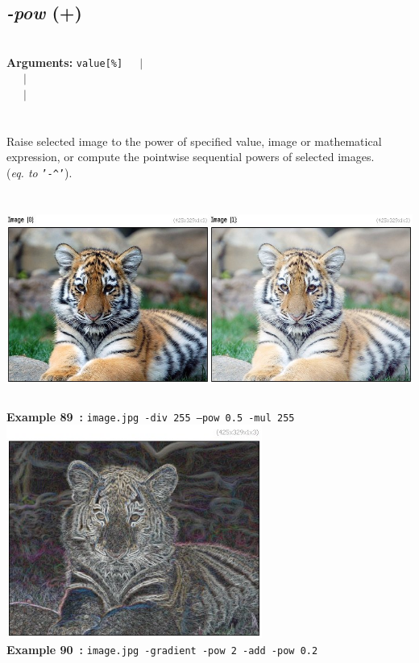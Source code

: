 \documentclass[a4paper,11pt,twoside]{book}
\begin{document}
\subsection{\emph{-pow} (+)}\vspace*{-0.5em}
~\\\textbf{Arguments: } 
{\small \texttt{value[\%]}}~~~$|$\\
\hspace*{2.2cm}{\small \texttt{[image]}}~~~$|$\\
~~~$|$\\
\\~\\
Raise selected image to the power of specified value, image or mathematical
expression, or compute the pointwise sequential powers of selected images.
~\\(\emph{eq. to} {\small \texttt{'-\textasciicircum '}}).
\begin{center}\includegraphics[keepaspectratio=true,height=7cm,width=\textwidth]{img/gmic_def89.jpg}\\
{\footnotesize \textbf{Example 89~:} \texttt{image.jpg -div 255 --pow 0.5 -mul 255}}
\\\includegraphics[keepaspectratio=true,height=7cm,width=\textwidth]{img/gmic_def90.jpg}\\
{\footnotesize \textbf{Example 90~:} \texttt{image.jpg -gradient -pow 2 -add -pow 0.2}}
\end{center}
\end{document}
